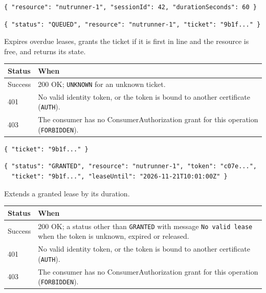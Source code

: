 \documentclass[a4paper]{arrowhead}
\begin{document}
\begin{lstlisting}[caption={Example request body}]
{ "resource": "nutrunner-1", "sessionId": 42, "durationSeconds": 60 }
\end{lstlisting}


\begin{lstlisting}[caption={Example response body}]
{ "status": "QUEUED", "resource": "nutrunner-1", "ticket": "9b1f..." }
\end{lstlisting}

Expires overdue leases, grants the ticket if it is first in line and the resource is free, and returns its state.

{\small
\begin{longtable}{|p{2.0cm}|p{13.8cm}|}

\hline
\rowcolor{gray!33} Status & When \\ \hline
\endhead
Success & 200 OK; \texttt{UNKNOWN} for an unknown ticket. \\ \hline
401 & No valid identity token, or the token is bound to another certificate (\texttt{AUTH}). \\ \hline
403 & The consumer has no ConsumerAuthorization grant for this operation (\texttt{FORBIDDEN}). \\ \hline
\end{longtable}
}


\begin{lstlisting}[caption={Example request body}]
{ "ticket": "9b1f..." }
\end{lstlisting}


\begin{lstlisting}[caption={Example response body}]
{ "status": "GRANTED", "resource": "nutrunner-1", "token": "c07e...",
  "ticket": "9b1f...", "leaseUntil": "2026-11-21T10:01:00Z" }
\end{lstlisting}

Extends a granted lease by its duration.

{\small
\begin{longtable}{|p{2.0cm}|p{13.8cm}|}

\hline
\rowcolor{gray!33} Status & When \\ \hline
\endhead
Success & 200 OK; a status other than \texttt{GRANTED} with message \texttt{No valid lease} when the token is unknown, expired or released. \\ \hline
401 & No valid identity token, or the token is bound to another certificate (\texttt{AUTH}). \\ \hline
403 & The consumer has no ConsumerAuthorization grant for this operation (\texttt{FORBIDDEN}). \\ \hline
\end{longtable}
}
\end{document}
